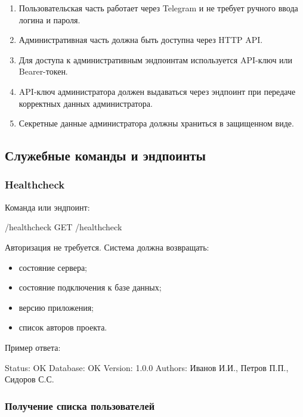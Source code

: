 \documentclass[10pt,a4paper,final]{article} %
\begin{document}
\begin{enumerate}[label=\arabic*.]
    \item Пользовательская часть работает через Telegram и не требует ручного ввода логина и пароля.
    \item Административная часть должна быть доступна через HTTP API.
    \item Для доступа к административным эндпоинтам используется API-ключ или Bearer-токен.
    \item API-ключ администратора должен выдаваться через эндпоинт  при передаче корректных данных администратора.
    \item Секретные данные администратора должны храниться в защищенном виде.
\end{enumerate}

\subsection{Служебные команды и эндпоинты}

\subsubsection{Healthcheck}

Команда или эндпоинт:

\begin{Code}
/healthcheck
GET /healthcheck
\end{Code}

Авторизация не требуется. Система должна возвращать:

\begin{itemize}
    \item состояние сервера;
    \item состояние подключения к базе данных;
    \item версию приложения;
    \item список авторов проекта.
\end{itemize}

Пример ответа:

\begin{Code}
Status: OK
Database: OK
Version: 1.0.0
Authors: Иванов И.И., Петров П.П., Сидоров С.С.
\end{Code}

\subsubsection{Получение списка пользователей}
\end{document}
